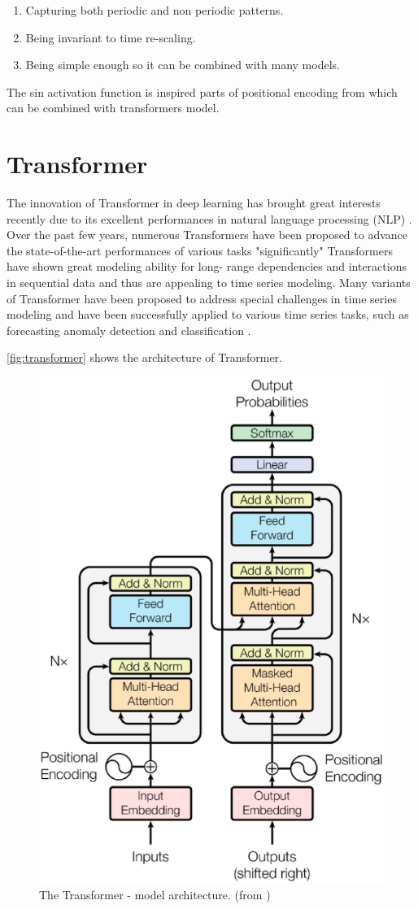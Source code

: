 \begin{enumerate}
	\item \label{step:first} Capturing both periodic and non periodic patterns.
	
	\item Being invariant to time re-scaling.
	
	\item Being simple enough so it can be combined with many models.
\end{enumerate}

The sin activation function is inspired parts of positional encoding from \cite{DBLP:journals/corr/VaswaniSPUJGKP17}
which can be combined with transformers model.

\section{Transformer}
The innovation of Transformer in deep learning \cite{DBLP:journals/corr/VaswaniSPUJGKP17}
has brought great interests recently due to its excellent performances in natural
language processing (NLP) \cite{devlin-etal-2019-bert}. Over the past few years,
numerous Transformers have been proposed to advance the state-of-the-art performances
of various tasks "significantly" Transformers have shown great modeling ability for
long- range dependencies and interactions in sequential data and thus are
appealing to time series modeling. Many variants of Transformer have been proposed
to address special challenges in time series modeling and have been successfully
applied to various time series tasks, such as forecasting anomaly detection and
classification \cite{wen2023transformers}.

\autoref{fig:transformer} shows the architecture of Transformer.

\begin{figure}[H]
	\centering
	\includegraphics[width=0.65\linewidth]{images/trans.eps}
	\caption{The Transformer - model architecture. (from \cite{pic4trans})}
	\label{fig:transformer}
\end{figure}

